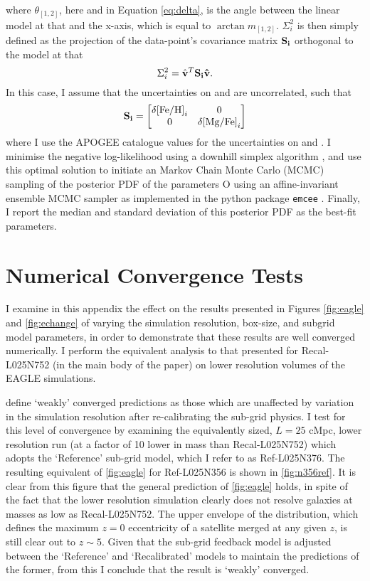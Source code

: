 where $\theta_{[1,2]}$, here and in Equation \eqref{eq:delta}, is
the angle between the linear model at that \feh{} and the x-axis,
which is equal to $\arctan{m_{[1,2]}}$. $\Sigma^2_i$ is then simply
defined as the projection of the data-point's covariance matrix
$\bf{S}_i$ orthogonal to the model at that \feh{}
\begin{equation}
\Sigma^2_i = \hat{\bf{v}}^T \bf{S}_i \hat{\bf{v}}.
\end{equation}
In this case, I assume that the uncertainties on \mgfe{} and \feh{}
are uncorrelated, such that
\begin{equation}
\bf{S}_i = \begin{bmatrix} \delta \mathrm{[Fe/H]}_i & 0 \\ 0 & \delta \mathrm{[Mg/Fe]}_i \end{bmatrix}
\end{equation}
where I use the APOGEE catalogue values for the uncertainties on \feh{}
and \mgfe{}. I minimise the negative log-likelihood using a downhill
simplex algorithm \citep{doi:10.1093/comjnl/7.4.308}, and use this
optimal solution to initiate an Markov Chain Monte Carlo (MCMC)
sampling of the posterior PDF of the parameters O using an
affine-invariant ensemble MCMC sampler \citep{goodmanweare2010} as
implemented in the python package \texttt{emcee}
\citep{2013PASP..125..306F}. Finally, I report the median and standard
deviation of this posterior PDF as the best-fit parameters.

\section{Numerical Convergence Tests}
\label{sec:appB}
I examine in this appendix the effect on the results presented in Figures
\ref{fig:eagle} and \ref{fig:echange} of varying the simulation
resolution, box-size, and subgrid model parameters, in order to
demonstrate that these results are well converged numerically. I
perform the equivalent analysis to that presented for Recal-L025N752
(in the main body of the paper) on lower resolution volumes of the
EAGLE simulations.

\citet{2015MNRAS.446..521S} define `weakly' converged predictions
as those which are unaffected by variation in the simulation
resolution after re-calibrating the sub-grid physics. I test for this level of convergence
by examining the equivalently sized, $L=25$ cMpc, lower resolution
run (at a factor of 10 lower in mass than Recal-L025N752) which
adopts the `Reference' sub-grid model, which I refer to as
Ref-L025N376. The resulting equivalent of \ref{fig:eagle}
for Ref-L025N356 is shown in \ref{fig:n356ref}. It is clear from this figure
that the general prediction of \ref{fig:eagle} holds, in spite of
the fact that the lower resolution simulation clearly does not
resolve galaxies at masses as low as Recal-L025N752. The upper
envelope of the distribution, which defines the maximum $z=0$
eccentricity of a satellite merged at any given $z$, is still clear
out to $z\sim5$. Given that the sub-grid feedback model is adjusted
between the `Reference' and `Recalibrated' models to maintain the
predictions of the former, from this I conclude that the result is
`weakly' converged.

